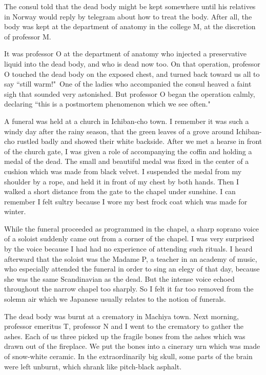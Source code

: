 \documentclass[11pt,a4j,twocolumn]{jarticle}
\begin{document}
The consul told that the dead body might be kept somewhere
until his relatives in Norway would reply by telegram
about how to treat the body.
After all, the body was kept at the department of anatomy 
in the college M, at the discretion of professor M.

It was professor O at the department of anatomy who injected 
a preservative liquid into the dead body, and who is dead now too.
On that operation, professor O touched the dead body on the exposed chest,
and turned back toward us all to say ``still warm!"\,
One of the ladies who accompanied the consul heaved a faint sigh
that sounded very astonished.
But professor O began the operation calmly,
declaring ``this is a postmortem phenomenon which we see often."

A funeral was held at a church in Ichiban-cho town.
I remember it was such a windy day after the rainy season,
that the green leaves of a grove around Ichiban-cho
rustled badly and showed their white backside.
After we met a hearse in front of the church gate,
I was given a role of accompanying the coffin and 
holding a medal of the dead.
The small and beautiful medal was fixed in the center of
a cushion which was made from black velvet.
I suspended the medal from my shoulder by a rope,
and held it in front of my chest by both hands.
Then I walked a short distance from the gate to the chapel under sunshine.
I can remember I felt sultry because I wore my best frock coat
which was made for winter.

While the funeral proceeded as programmed in the chapel,
a sharp soprano voice of a soloist suddenly came out
from a corner of the chapel.
I was very surprised by the voice because I had had no
experience of attending such rituals.
I heard afterward that the soloist was the Madame P, 
a teacher in an academy of music, who especially attended the funeral
in order to sing an elegy of that day, because she was
the same Scandinavian as the dead.
But the intense voice echoed throughout the narrow chapel too sharply.
So I felt it far too removed from the solemn air which
we Japanese usually relates to the notion of funerals.

The dead body was burnt at a crematory in Machiya town.
Next morning, professor emeritus T, professor N and I
went to the crematory to gather the ashes.
Each of us three picked up the fragile bones
from the ashes which was drawn out of the fireplace.
We put the bones into a cinerary urn which was made of snow-white ceramic.
In the extraordinarily big skull, some parts of the brain were left unburnt,
which shrank like pitch-black asphalt.
\end{document}
